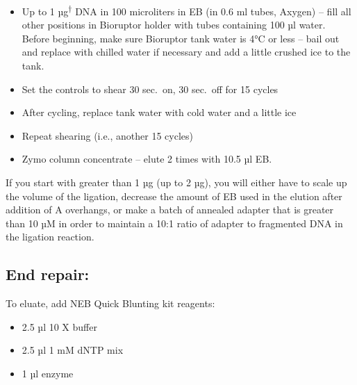 \documentclass[
  letterpaper,
  DIV=11,
  numbers=noendperiod]{scrreprt}
\providecommand{\tightlist}{%
  \setlength{\itemsep}{0pt}\setlength{\parskip}{0pt}}\usepackage{longtable,booktabs,array}
\begin{document}
\begin{itemize}
\tightlist
\item
  Up to 1 µg\textsuperscript{†} DNA in 100 microliters in EB (in 0.6 ml
  tubes, Axygen) -- fill all other positions in Bioruptor holder with
  tubes containing 100 µl water. Before beginning, make sure Bioruptor
  tank water is 4°C or less -- bail out and replace with chilled water
  if necessary and add a little crushed ice to the tank.
\item
  Set the controls to shear 30 sec.~on, 30 sec.~off for 15 cycles
\item
  After cycling, replace tank water with cold water and a little ice
\item
  Repeat shearing (i.e., another 15 cycles)
\item
  Zymo column concentrate -- elute 2 times with 10.5 µl EB.
\end{itemize}

\begin{tcolorbox}[enhanced jigsaw, toprule=.15mm, breakable, coltitle=black, leftrule=.75mm, title=\textcolor{quarto-callout-warning-color}{\faExclamationTriangle}\hspace{0.5em}{NOTES}, bottomrule=.15mm, toptitle=1mm, bottomtitle=1mm, colframe=quarto-callout-warning-color-frame, opacityback=0, colback=white, opacitybacktitle=0.6, colbacktitle=quarto-callout-warning-color!10!white, rightrule=.15mm, titlerule=0mm, arc=.35mm, left=2mm]

If you start with greater than 1 µg (up to 2 µg), you will either have
to scale up the volume of the ligation, decrease the amount of EB used
in the elution after addition of A overhangs, or make a batch of
annealed adapter that is greater than 10 µM in order to maintain a 10:1
ratio of adapter to fragmented DNA in the ligation reaction.

\end{tcolorbox}

\hypertarget{end-repair}{%
\subsection{End repair:}\label{end-repair}}

To eluate, add NEB Quick Blunting kit reagents:

\begin{itemize}
\tightlist
\item
  2.5 µl 10 X buffer
\item
  2.5 µl 1 mM dNTP mix
\item
  1 µl enzyme
\end{itemize}
\end{document}

